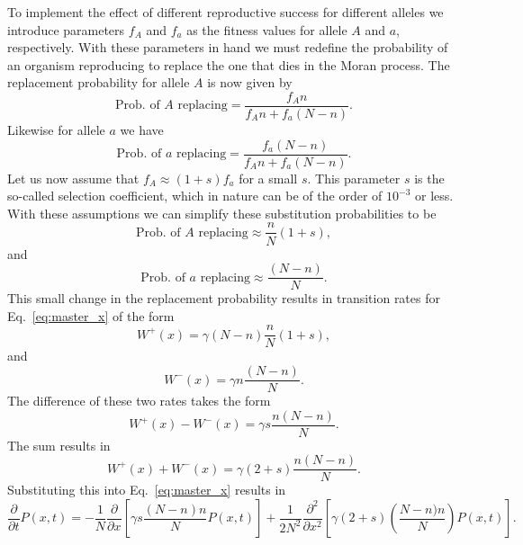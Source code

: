 To implement the effect of different reproductive success for different alleles
we introduce parameters $f_A$ and $f_a$ as the fitness values for allele $A$ and
$a$, respectively. With these parameters in hand we must redefine the
probability of an organism reproducing to replace the one that dies in the Moran
process. The replacement probability for allele $A$ is now given by
\begin{equation}
    \text{Prob. of $A$ replacing} = \frac{f_A n}{f_A n + f_a (N - n)}.
\end{equation}
Likewise for allele $a$ we have
\begin{equation}
    \text{Prob. of $a$ replacing} = \frac{f_a (N - n)}{f_A n + f_a (N - n)}.
\end{equation}
Let us now assume that $f_A \approx (1 + s) f_a$ for a small $s$. This parameter
$s$ is the so-called selection coefficient, which in nature can be of the order
of $10^{-3}$ or less. With these assumptions we can simplify these substitution
probabilities to be
\begin{equation}
    \text{Prob. of $A$ replacing} \approx \frac{n}{N}(1 + s),
\end{equation}
and
\begin{equation}
    \text{Prob. of $a$ replacing} \approx \frac{(N - n)}{N}.
\end{equation}
This small change in the replacement probability results in transition rates for
Eq.~\ref{eq:master_x} of the form
\begin{equation}
    W^+(x) = \gamma (N - n) \frac{n}{N} (1 + s),
\end{equation}
and
\begin{equation}
    W^-(x) = \gamma n \frac{(N - n)}{N}.
\end{equation}
The difference of these two rates takes the form
\begin{equation}
    W^+(x) - W^-(x) = \gamma s \frac{n(N-n)}{N}.
\end{equation}
The sum results in
\begin{equation}
    W^+(x) + W^-(x) = \gamma (2 + s) \frac{n(N-n)}{N}.
\end{equation}
Substituting this into Eq.~\ref{eq:master_x} results in
\begin{equation}
    \frac{\partial}{\partial t} P(x, t) =
    -\frac{1}{N} 
    \frac{\partial}{\partial x}\left[\gamma s \frac{(N-n) n}{N} P(x, t)\right] 
    +\frac{1}{2 N^{2}} 
    \frac{\partial^{2}}{\partial x^{2}}
    \left[\gamma (2+s)\left(\frac{N-n) n}{N}\right) P(x, t)\right].
\end{equation}
